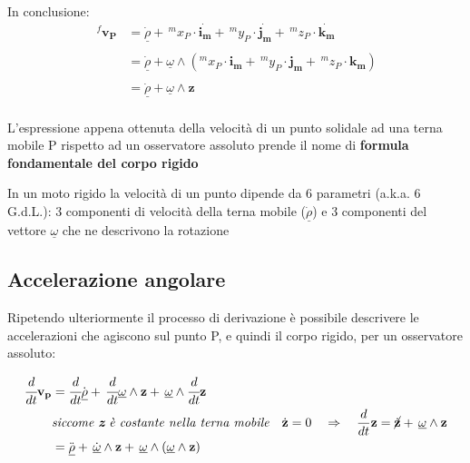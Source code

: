 		
		In conclusione:
		\begin{equation*}
		\begin{split}
			 \,^f\mathbf{v_P} &= \dot{\underline{\rho}} + \,^mx_P \cdot \dot{\mathbf{i_m}} + \,^my_P \cdot \dot{\mathbf{j_m}} + \,^mz_P \cdot \dot{\mathbf{k_m}}\\
\\
&=  \dot{\underline{\rho}} + \underline{\omega} \wedge (^mx_P \cdot \mathbf{i_m} +\, ^my_P \cdot \mathbf{j_m} +\, ^mz_P \cdot \mathbf{k_m})\\
\\
&=  \dot{\underline{\rho}} + \underline{\omega} \wedge \mathbf{z} \\
		\end{split}
		\end{equation*}
		
		L'espressione appena ottenuta della velocità di un punto solidale ad una terna mobile P rispetto ad un osservatore assoluto prende il nome di \textbf{formula fondamentale del corpo rigido}
		
		In un moto rigido la velocità di un punto dipende da 6 parametri (a.k.a. 6 G.d.L.): 3 componenti di velocità della terna mobile ($\dot{\underline{\rho}}$) e 3 componenti del vettore ${\underline{\omega}}$ che ne descrivono la rotazione
		
				\subsection{Accelerazione angolare}
			 Ripetendo ulteriormente il processo di derivazione è possibile descrivere le accelerazioni che agiscono sul punto P, e quindi il corpo rigido, per un osservatore assoluto:
		 
		 	\begin{align*}
		 		\cfrac{d}{dt} \mathbf{v_p} &= \cfrac{d}{dt}\dot{\underline{\rho}} + \, \cfrac{d}{dt}{\underline{\omega}} \wedge \mathbf{z} + \, \underline{\omega} \wedge \cfrac{d}{dt}{\mathbf{z}}\\
		 		 					& \emph{siccome \textbf{z} è costante nella terna mobile} \quad \dot{\mathbf{z}} = 0 \quad \Rightarrow \quad\frac{d}{dt}\mathbf{z} = \cancel{\dot{\mathbf{z}}} +\, \underline{\omega} \wedge \mathbf{z}\\
		 							 &= \ddot{\underline{\rho}} + \, \dot{\underline{\omega}} \wedge \mathbf{z} + \, \underline{\omega} \wedge (\underline{\omega} \wedge \mathbf{z})\\	 
		 	\end{align*}
		
